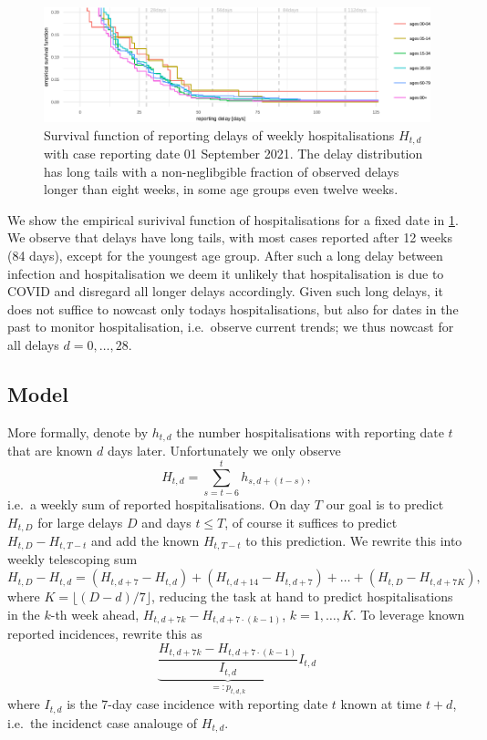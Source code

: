 \begin{figure}

    {\centering \includegraphics[width=\textwidth]{figures_tentative/delay_tails-1} 

}

\caption{Survival function of reporting delays of weekly hospitalisations $H_{t,d}$ with case reporting date 01 September 2021. The delay distribution has long tails with a non-neglibgible fraction of observed delays longer than eight weeks, in some age groups even twelve weeks.}\label{fig:delay_tails}
\end{figure}

We show the empirical surivival function of hospitalisations for a fixed
date in \cref{fig:delay_tails}. We observe that delays have long
tails, with most cases reported after 12 weeks (84 days), except for the
youngest age group. After such a long delay between infection and
hospitalisation we deem it unlikely that hospitalisation is due to COVID
and disregard all longer delays accordingly. Given such long delays, it
does not suffice to nowcast only todays hospitalisations, but also for
dates in the past to monitor hospitalisation, i.e.~observe current
trends; we thus nowcast for all delays \(d = 0, \dots, 28\).

\subsection{Model}
More formally, denote by \(h_{t,d}\) the number hospitalisations with
reporting date \(t\) that are known \(d\) days later. Unfortunately we
only observe \[H_{t,d} = \sum_{s = t - 6}^{t} h_{s,d + (t - s)},\]
i.e.~a weekly sum of reported hospitalisations. On day \(T\) our goal is
to predict \(H_{t,D}\) for large delays \(D\) and days \(t \leq T\), of
course it suffices to predict \(H_{t, D} - H_{t, T - t}\) and add the
known \(H_{t, T - t}\) to this prediction. We rewrite this into weekly
telescoping sum \[
H_{t,D} - H_{t,d} = \left(H_{t, d + 7} - H_{t,d}\right) + \left(H_{t, d + 14} - H_{t, d + 7}\right) + \dots + \left(H_{t,D} - H_{t, d + 7 K}\right),
\] where \(K = \lfloor (D -d) / 7 \rfloor\), reducing the task at hand
to predict hospitalisations in the \(k\)-th week ahead,
\(H_{t, d + 7k} - H_{t, d + 7\cdot(k - 1)}\), \(k = 1, \dots, K\). To
leverage known reported incidences, rewrite this as
\[\underbrace{\frac{H_{t, d + 7k} - H_{t, d + 7\cdot(k - 1)}}{I_{t,d}}}_{=:p_{t,d,k}} I_{t, d}\]
where \(I_{t,d}\) is the \(7\)-day case incidence with reporting date
\(t\) known at time \(t + d\), i.e.~the incidenct case analouge of
\(H_{t,d}\).

